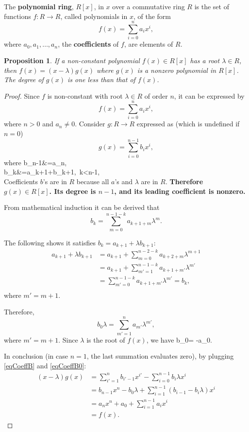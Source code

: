 \documentclass[12pt, letterpaper]{article}
\newenvironment{eqlong}{\equation\aligned}{\endaligned\endequation}
\newtheorem{prop}{Proposition}[section]
\theoremstyle{definition}
\theoremstyle{remark}
\theoremstyle{definition}
\theoremstyle{plain}
\begin{document}
	\begin{def*}
		The \textbf{polynomial ring}, $R[x]$, in $x$ over a commutative ring $R$
		is the set of functions $f\colon R\to R$, called polynomials in $x$, of the form
		\[f(x)=\sum_{i=0}^{n}a_ix^i,\]
		where $a_0, a_1, \dots, a_n$, the \textbf{coefficients} of $f$, are elements of $R$.
	\end{def*}
	\begin{prop}
		If a non-constant polynomial $f(x)\in R[x]$ has a root $\lambda\in R$,
		then $f(x)=(x-\lambda)g(x)$ where $g(x)$ is a nonzero polynomial in $R[x]$.
		The degree of $g(x)$ is one less than that of $f(x)$.
	\end{prop}
	\begin{proof}
		Since $f$ is non-constant with root $\lambda\in R$ of order $n$, it can be expressed by
		\[f(x)=\sum_{i=0}^{n}a_ix^i,\]
		where $n>0$ and $a_n\ne0$.
		Consider $g\colon R\to R$ expressed as (which is undefined if $n=0$)
		\[g(x)=\sum_{i=0}^{n-1}b_ix^i, \]
		where 
		\begin{eqlong}\label{eqCoeffB}
			b_{n-1}&=a_{n},\\
			b_k&=a_{k+1}+\lambda b_{k+1},\,\,\,\le k<n-1,\\
		\end{eqlong}
		Coefficients $b$'s are in $R$ because all $a$'s and $\lambda$ are in $R$.
		\textbf{Therefore $g(x)\in R[x]$. Its degree is $n-1$,
		and its leading coefficient is nonzero.}
		
		From mathematical induction it can be derived that
		\[b_k = \sum_{m=0}^{n-1-k} a_{k+1+m}\lambda^m. \]
		
		The following shows it satisfies $b_k=a_{k+1}+\lambda b_{k+1}$:
		\[\begin{aligned}
			a_{k+1}+\lambda b_{k+1} &= a_{k+1}+\sum_{m=0}^{n-2-k} a_{k+2+m}\lambda^{m+1}\\
			&=a_{k+1}+\sum_{m'=1}^{n-1-k} a_{k+1+m'}\lambda^{m'}\\
			&=\sum_{m'=0}^{n-1-k} a_{k+1+m'}\lambda^{m'}=b_k,\\
		\end{aligned}\]
		where $m'=m+1$.
		
		Therefore,
		\[b_0\lambda =\sum_{m'=1}^{n}a_{m'}\lambda^{m'},\]
		where $m'=m+1$. Since $\lambda$ is the root of $f(x)$,
		we have
		\begin{eqlong}\label{eqCoeffB0}
			b_0\lambda = -a_0.\\
		\end{eqlong}
		
		In conclusion (in case $n=1$, the last summation evaluates zero),
		by plugging \eqref{eqCoeffB} and \eqref{eqCoeffB0}:
		\[
		\begin{aligned}
			(x-\lambda)g(x)&=\sum_{i'=1}^{n}b_{i'-1}x^{i'}-\sum_{i=0}^{n-1}b_i\lambda x^i\\
			&=b_{n-1}x^{n}-b_0\lambda+\sum_{i=1}^{n-1}(b_{i-1}-b_i\lambda)x^i\\
			&=a_nx^{n}+a_0+\sum_{i=1}^{n-1}a_ix^i\\
			&=f(x).
		\end{aligned}
		\]
	\end{proof}
	
\end{document}
